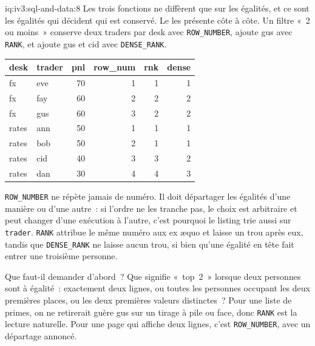 \begin{solution}{iq:iv3:sql-and-data:8}
Les trois fonctions ne diffèrent que sur les égalités, et ce sont les égalités qui décident qui est conservé. Le  les présente côte à côte. Un filtre «~2 ou moins~» conserve deux traders par desk avec \texttt{ROW\_NUMBER}, ajoute gus avec \texttt{RANK}, et ajoute gus et cid avec \texttt{DENSE\_RANK}.
\label{lst:iv3:sq:ranks}
\begin{center}\small
\begin{tabular}{llrrrr}
desk & trader & pnl & row\_num & rnk & dense\\\hline
fx & eve & 70 & 1 & 1 & 1\\
fx & fay & 60 & 2 & 2 & 2\\
fx & gus & 60 & 3 & 2 & 2\\
rates & ann & 50 & 1 & 1 & 1\\
rates & bob & 50 & 2 & 1 & 1\\
rates & cid & 40 & 3 & 3 & 2\\
rates & dan & 30 & 4 & 4 & 3
\end{tabular}
\end{center}
\texttt{ROW\_NUMBER} ne répète jamais de numéro. Il doit départager les égalités d'une manière ou d'une autre~: si l'ordre ne les tranche pas, le choix est arbitraire et peut changer d'une exécution à l'autre, c'est pourquoi le listing trie aussi sur \texttt{trader}. \texttt{RANK} attribue le même numéro aux ex æquo et laisse un trou après eux, tandis que \texttt{DENSE\_RANK} ne laisse aucun trou, si bien qu'une égalité en tête fait entrer une troisième personne.

Que faut-il demander d'abord~? Que signifie «~top~2~» lorsque deux personnes sont à égalité~: exactement deux lignes, ou toutes les personnes occupant les deux premières places, ou les deux premières valeurs distinctes~? Pour une liste de primes, on ne retirerait guère gus sur un tirage à pile ou face, donc \texttt{RANK} est la lecture naturelle. Pour une page qui affiche deux lignes, c'est \texttt{ROW\_NUMBER}, avec un départage annoncé.

\end{solution}

